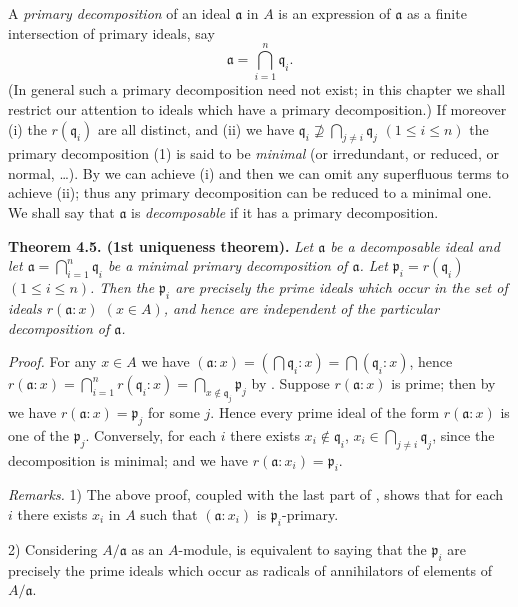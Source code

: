 A \emph{primary decomposition} of an ideal \(\mathfrak a\) in \(A\) is an expression of \(\mathfrak a\) as a finite intersection of primary ideals, say
\[
\mathfrak a=\bigcap_{i=1}^n\mathfrak q_i. \tag{1}
\]
(In general such a primary decomposition need not exist; in this chapter we shall restrict our attention to ideals which have a primary decomposition.) If moreover (i) the \(r(\mathfrak q_i)\) are all distinct, and (ii) we have \(\mathfrak q_i\not\supseteq\bigcap_{j\neq i}\mathfrak q_j\) \((1\leq i\leq n)\) the primary decomposition (1) is said to be \emph{minimal} (or irredundant, or reduced, or normal, \ldots). By  we can achieve (i) and then we can omit any superfluous terms to achieve (ii); thus any primary decomposition can be reduced to a minimal one. We shall say that \(\mathfrak a\) is \emph{decomposable} if it has a primary decomposition.

\noindent\textbf{Theorem 4.5. (1st uniqueness theorem).} \emph{Let \(\mathfrak a\) be a decomposable ideal and let \(\mathfrak a=\bigcap_{i=1}^n\mathfrak q_i\) be a minimal primary decomposition of \(\mathfrak a\). Let \(\mathfrak p_i=r(\mathfrak q_i)\) \((1\leq i\leq n)\). Then the \(\mathfrak p_i\) are precisely the prime ideals which occur in the set of ideals \(r(\mathfrak a:x)\) \((x\in A)\), and hence are independent of the particular decomposition of \(\mathfrak a\).}

\noindent\emph{Proof.} For any \(x\in A\) we have \((\mathfrak a:x)=(\bigcap\mathfrak q_i:x)=\bigcap(\mathfrak q_i:x)\), hence \(r(\mathfrak a:x)=\bigcap_{i=1}^n r(\mathfrak q_i:x)=\bigcap_{x\notin\mathfrak q_j}\mathfrak p_j\) by . Suppose \(r(\mathfrak a:x)\) is prime; then by  we have \(r(\mathfrak a:x)=\mathfrak p_j\) for some \(j\). Hence every prime ideal of the form \(r(\mathfrak a:x)\) is one of the \(\mathfrak p_j\). Conversely, for each \(i\) there exists \(x_i\notin\mathfrak q_i\), \(x_i\in\bigcap_{j\neq i}\mathfrak q_j\), since the decomposition is minimal; and we have \(r(\mathfrak a:x_i)=\mathfrak p_i\). \proofbox

\noindent\emph{Remarks.} 1) The above proof, coupled with the last part of , shows that for each \(i\) there exists \(x_i\) in \(A\) such that \((\mathfrak a:x_i)\) is \(\mathfrak p_i\)-primary.

2) Considering \(A/\mathfrak a\) as an \(A\)-module,  is equivalent to saying that the \(\mathfrak p_i\) are precisely the prime ideals which occur as radicals of annihilators of elements of \(A/\mathfrak a\).


